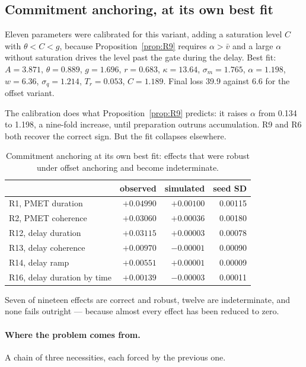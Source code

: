 \documentclass[11pt,a4paper]{article}
\theoremstyle{plain}
\theoremstyle{remark}
\begin{document}
\subsection{Commitment anchoring, at its own best fit}
\label{sec:anchor}

Eleven parameters were calibrated for this variant, adding a saturation level $C$ with
$\theta<C<g$, because Proposition~\ref{prop:R9} requires $\alpha>\bar v$ and a large
$\alpha$ without saturation drives the level past the gate during the delay. Best fit:
$A=3.871$, $\theta=0.889$, $g=1.696$, $r=0.683$, $\kappa=13.64$, $\sigma_m=1.765$,
$\alpha=1.198$, $w=6.36$, $\sigma_q=1.214$, $T_r=0.053$, $C=1.189$. Final loss 39.9 against
6.6 for the offset variant.

The calibration does what Proposition~\ref{prop:R9} predicts: it raises $\alpha$ from 0.134
to 1.198, a nine-fold increase, until preparation outruns accumulation. R9 and R6 both
recover the correct sign. But the fit collapses elsewhere.

\begin{table}[htbp]
\centering
\caption{Commitment anchoring at its own best fit: effects that were robust under offset
anchoring and become indeterminate.}
\begin{tabular}{lrrr}
\toprule
& observed & simulated & seed SD\\
\midrule
R1, PMET duration & $+0.04990$ & $+0.00100$ & 0.00115\\
R2, PMET coherence & $+0.03060$ & $+0.00036$ & 0.00180\\
R12, delay duration & $+0.03115$ & $+0.00003$ & 0.00078\\
R13, delay coherence & $+0.00970$ & $-0.00001$ & 0.00090\\
R14, delay ramp & $+0.00551$ & $+0.00001$ & 0.00009\\
R16, delay duration by time & $+0.00139$ & $-0.00003$ & 0.00011\\
\bottomrule
\end{tabular}
\end{table}

Seven of nineteen effects are correct and robust, twelve are indeterminate, and none fails
outright --- because almost every effect has been reduced to zero.

\paragraph{Where the problem comes from.} A chain of three necessities, each forced by the
previous one.
\end{document}
